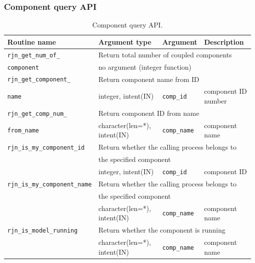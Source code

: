 \documentclass[11pt,a4paper]{report}
\begin{document}
\subsubsection{Component query API}

\begin{table}[H]
\begin{center}
\caption{Component query API.}
{\small
\label{table:rjn_api_comp_query}
\begin{tabular}{llll}
\hline\hline
Routine name & Argument type & Argument & Description \\
\hline
 \texttt{rjn\_get\_num\_of\_} & \multicolumn{3}{l}{Return total number of coupled components}\\
 \texttt{component}
           & \multicolumn{3}{l}{no argument (integer function)}\\
\hline
 \texttt{rjn\_get\_component\_} & \multicolumn{3}{l}{Return component name from ID}\\
 \texttt{name}
           & integer, intent(IN) & \texttt{comp\_id} & component ID number\\
\hline
 \texttt{rjn\_get\_comp\_num\_} & \multicolumn{3}{l}{Return component ID from name}\\
 \texttt{from\_name}
           & character(len=*), intent(IN) & \texttt{comp\_name} & component name\\
\hline
 \texttt{rjn\_is\_my\_component\_id} & \multicolumn{3}{l}{Return whether the calling process belongs to}\\
           & \multicolumn{3}{l}{the specified component}\\
           & integer, intent(IN) & \texttt{comp\_id} & component ID\\
\hline
 \texttt{rjn\_is\_my\_component\_name} & \multicolumn{3}{l}{Return whether the calling process belongs to}\\
           & \multicolumn{3}{l}{the specified component}\\
           & character(len=*), intent(IN) & \texttt{comp\_name} & component name\\
\hline
 \texttt{rjn\_is\_model\_running} & \multicolumn{3}{l}{Return whether the component is running}\\
           & character(len=*), intent(IN) & \texttt{comp\_name} & component name\\
\hline\hline
\end{tabular}
}
\end{center}
\end{table}
\end{document}
